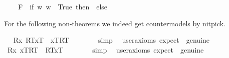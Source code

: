\begin{isabellebody}
\ \ \ \ F{\isacharparenleft}{\isasympsi}{\isacharparenright}\ {\isasymRightarrow}\ if\ {\isasymforall}w{\isachardot}{\isasymnot}{\isacharparenleft}{\isasympsi}\ w{\isacharparenright}\ {\isasymlongleftrightarrow}\ True\ then\ {\isasymtop}\ else\ {\isasymbottom}\ {\isacharbar}\ \isanewline
\ \ \ \ {\isacharunderscore}\ {\isasymRightarrow}\ {\isacharasterisk}{\isachardoublequoteclose}%
\isamarkuptrue%
%
\isamarkuptrue%
%
\begin{isamarkuptext}%
For the following non-theorems we indeed get countermodels by nitpick.%
\end{isamarkuptext}\isamarkuptrue%
\ \isamarkupfalse%
\ {\isachardoublequoteopen}{\isacharbrackleft}{\isacharparenleft}\isactrlbold {\isasymforall}R{\isachardot}\isactrlbold {\isasymforall}x{\isachardot}\ {\isasymlparr}R\isactrlsup T{\isacharcomma}x\isactrlsup T{\isasymrparr}\ \isactrlbold {\isasymrightarrow}\ {\isasymlbrace}x\isactrlsup T{\isacharcomma}R\isactrlsup T{\isasymrbrace}{\isacharparenright}{\isacharbrackright}\ {\isacharequal}\ {\isasymtop}{\isachardoublequoteclose}\ \isanewline
%
\isadelimproof
\ \ \ %
\endisadelimproof
%
\isatagproof
{}\isamarkupfalse%
\ simp\ \isamarkupfalse%
\ {\isacharbrackleft}user{\isacharunderscore}axioms{\isacharcomma}\ expect\ {\isacharequal}\ genuine{\isacharbrackright}\ \ \isamarkupfalse%
\ %
%
\endisatagproof
{\isafoldproof}%
%
\isadelimproof
\isanewline
%
\endisadelimproof
\ \isamarkupfalse%
\ {\isachardoublequoteopen}{\isacharbrackleft}{\isacharparenleft}\isactrlbold {\isasymforall}R{\isachardot}\isactrlbold {\isasymforall}x{\isachardot}\ {\isasymlbrace}x\isactrlsup T{\isacharcomma}R\isactrlsup T{\isasymrbrace}\ \isactrlbold {\isasymrightarrow}\ {\isasymlparr}R\isactrlsup T{\isacharcomma}x\isactrlsup T{\isasymrparr}{\isacharparenright}{\isacharbrackright}\ {\isacharequal}\ {\isasymtop}{\isachardoublequoteclose}\ \isanewline
%
\isadelimproof
\ \ \ %
\endisadelimproof
%
\isatagproof
{}\isamarkupfalse%
\ simp\ \isamarkupfalse%
\ {\isacharbrackleft}user{\isacharunderscore}axioms{\isacharcomma}\ expect\ {\isacharequal}\ genuine{\isacharbrackright}\ \ \isamarkupfalse%
\ %
%
\endisatagproof
{\isafoldproof}%
%
\isadelimproof
%
\endisadelimproof
%
\begin{isamarkuptext}%

\end{isamarkuptext}
\end{isabellebody}
